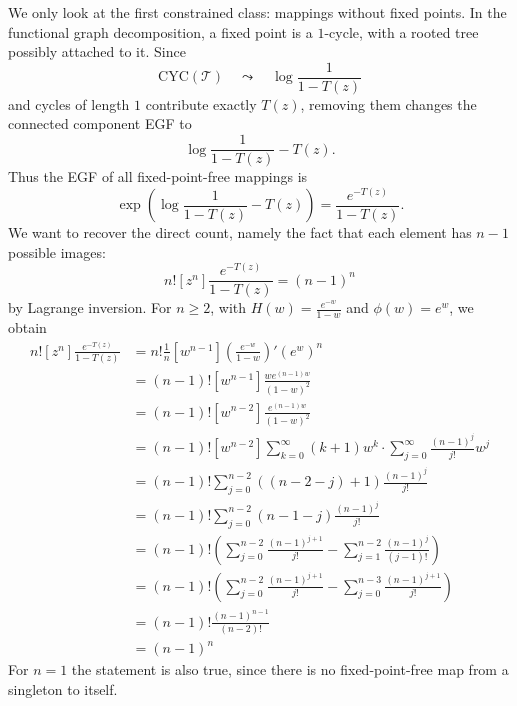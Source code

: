 We only look at the first constrained class: mappings without fixed points. In the functional
graph decomposition, a fixed point is a $1$-cycle, with a rooted tree possibly attached to it. Since
\[
    \mathrm{CYC}(\mathcal{T}) \quad\leadsto\quad \log\frac{1}{1 - T(z)}
\]
and cycles of length $1$ contribute exactly $T(z)$, removing them changes the connected
component EGF to
\[
    \log\frac{1}{1 - T(z)} - T(z).
\]
Thus the EGF of all fixed-point-free mappings is
\begin{equation*}
    \exp\left(\log\frac{1}{1 - T(z)} - T(z)\right)
    = \frac{e^{-T(z)}}{1 - T(z)}.
\end{equation*}
We want to recover the direct count, namely the fact that each element has $n - 1$ possible images:
\begin{equation*}
    n![z^{n}] \frac{e^{-T(z)}}{1 - T(z)} = (n - 1)^{n}
\end{equation*}
by Lagrange inversion. For $n \geq 2$, with $H(w) = \frac{e^{-w}}{1 - w}$ and $\phi(w) = e^{w}$, we obtain
\begin{equation*}
    \begin{aligned}
        n![z^{n}] \frac{e^{-T(z)}}{1 - T(z)}
        &= n!\frac{1}{n} [w^{n - 1}] \left(\frac{e^{-w}}{1 - w}\right)'(e^{w})^{n} \\
        &= (n - 1)![w^{n - 1}] \frac{we^{(n - 1)w}}{(1 - w)^{2}} \\
        &= (n - 1)![w^{n - 2}] \frac{e^{(n - 1)w}}{(1 - w)^{2}} \\
        &= (n - 1)![w^{n - 2}] \sum_{k = 0}^{\infty}(k + 1)w^{k} \cdot \sum_{j = 0}^{\infty} \frac{(n - 1)^{j}}{j!}w^{j} \\
        &= (n - 1)!\sum_{j = 0}^{n - 2}((n - 2 - j) + 1)\frac{(n - 1)^{j}}{j!} \\
        &= (n - 1)!\sum_{j = 0}^{n - 2}(n - 1 - j)\frac{(n - 1)^{j}}{j!} \\
        &= (n - 1)!\left(
            \sum_{j = 0}^{n - 2}\frac{(n - 1)^{j + 1}}{j!}
            - \sum_{j = 1}^{n - 2}\frac{(n - 1)^{j}}{(j - 1)!}
        \right) \\
        &= (n - 1)!\left(
            \sum_{j = 0}^{n - 2}\frac{(n - 1)^{j + 1}}{j!}
            - \sum_{j = 0}^{n - 3}\frac{(n - 1)^{j + 1}}{j!}
        \right) \\
        &= (n - 1)!\frac{(n - 1)^{n - 1}}{(n - 2)!} \\
        &= (n - 1)^{n}
    \end{aligned}
\end{equation*}
For $n = 1$ the statement is also true, since there is no fixed-point-free map from a singleton
to itself.

